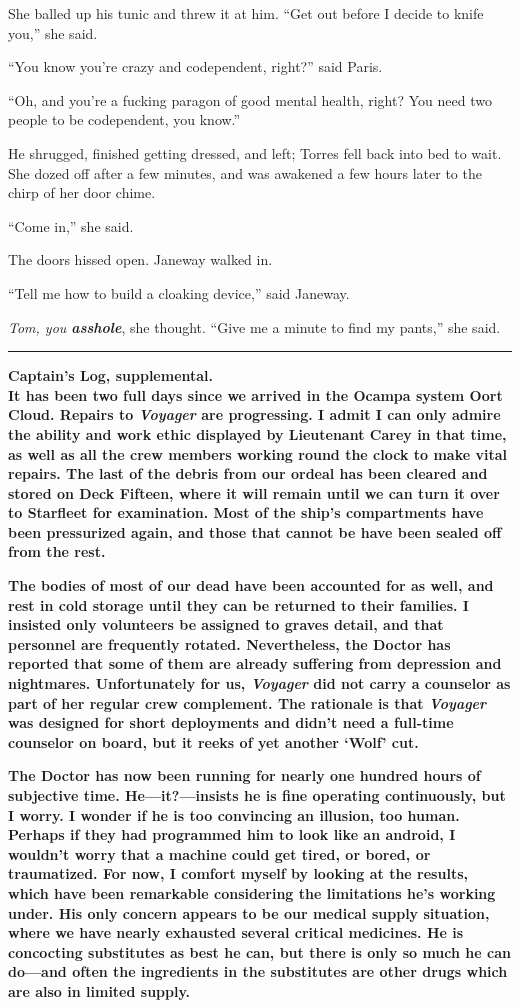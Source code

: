 \documentclass[twoside,letterpaper,12pt]{memoir}
\begin{document}
She balled up his tunic and threw it at him. ``Get out before I decide to knife you,'' she said. 

``You know you're crazy and codependent, right?'' said Paris. 

``Oh, and you're a fucking paragon of good mental health, right? You need two people to be codependent, you know.'' 

He shrugged, finished getting dressed, and left; Torres fell back into bed to wait. She dozed off after a few minutes, and was awakened a few hours later to the chirp of her door chime. 

``Come in,'' she said. 

The doors hissed open. Janeway walked in. 

``Tell me how to build a cloaking device,'' said Janeway. 

\textit{Tom, you \textbf{asshole}}, she thought. ``Give me a minute to find my pants,'' she said. 

\fancybreak{\rule{3cm}{0.4 pt}} 

\noindent\textbf{Captain's Log, supplemental.} \\

\textbf{It has been two full days since we arrived in the Ocampa system Oort Cloud. Repairs to \textit{Voyager} are progressing. I admit I can only admire the ability and work ethic displayed by Lieutenant Carey in that time, as well as all the crew members working round the clock to make vital repairs. The last of the debris from our ordeal has been cleared and stored on Deck Fifteen, where it will remain until we can turn it over to Starfleet for examination. Most of the ship's compartments have been pressurized again, and those that cannot be have been sealed off from the rest. }

\textbf{The bodies of most of our dead have been accounted for as well, and rest in cold storage until they can be returned to their families. I insisted only volunteers be assigned to graves detail, and that personnel are frequently rotated. Nevertheless, the Doctor has reported that some of them are already suffering from depression and nightmares. Unfortunately for us, \textit{Voyager} did not carry a counselor as part of her regular crew complement. The rationale is that \textit{Voyager} was designed for short deployments and didn't need a full-time counselor on board, but it reeks of yet another `Wolf' cut.} 

\textbf{The Doctor has now been running for nearly one hundred hours of subjective time. He---it?---insists he is fine operating continuously, but I worry. I wonder if he is too convincing an illusion, too human. Perhaps if they had programmed him to look like an android, I wouldn't worry that a machine could get tired, or bored, or traumatized. For now, I comfort myself by looking at the results, which have been remarkable considering the limitations he's working under. His only concern appears to be our medical supply situation, where we have nearly exhausted several critical medicines. He is concocting substitutes as best he can, but there is only so much he can do---and often the ingredients in the substitutes are other drugs which are also in limited supply.} 
\end{document}
